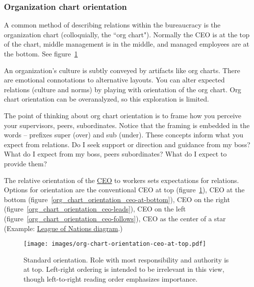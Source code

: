 \subsubsection{Organization chart orientation
\label{sec:org-chart-orientation}}

A common method of describing relations within the bureaucracy is the organization chart (colloquially, the ``\gls{org chart}"). Normally the CEO is at the top of the chart, middle management is in the middle, and managed employees are at the bottom. See figure~\ref{org_chart_orientation_ceo-at-top} 


An organization's culture is subtly conveyed by artifacts like org charts. 
There are emotional connotations to alternative layouts. You can alter expected relations (culture and norms) by playing with orientation of the org chart.
Org chart orientation can be overanalyzed, so this exploration is limited.

The point of thinking about org chart orientation is to frame how you perceive your supervisors, peers, subordinates. Notice that the framing is embedded in the words -- prefixes super (over) and sub (under). 
These concepts inform what you expect from relations.
Do I seek support or direction and guidance from my boss? What do I expect from my boss, peers subordinates? What do I expect to provide them?


The relative orientation of the \href{https://en.wikipedia.org/wiki/Chief_executive_officer}{CEO} 
to workers sets expectations for relations. 
Options for orientation are the conventional CEO at top
(figure~\ref{org_chart_orientation_ceo-at-top}), 
CEO at the bottom (figure~\ref{org_chart_orientation_ceo-at-bottom}),
CEO on the right (figure~\ref{org_chart_orientation_ceo-leads}),
CEO on the left (figure~\ref{org_chart_orientation_ceo-follows}),
CEO as the center of a star 
(Example: \href{https://en.wikipedia.org/wiki/File:League_of_Nations_Organization.png}{League of Nations diagram}.)

\begin{figure}
\texttt{[image: images/org-chart-orientation-ceo-at-top.pdf]}
\caption{Standard orientation. Role with most responsibility and authority is at top. Left-right ordering is intended to be irrelevant in this view, though left-to-right reading order emphasizes importance.}
\label{org_chart_orientation_ceo-at-top}
\end{figure}

